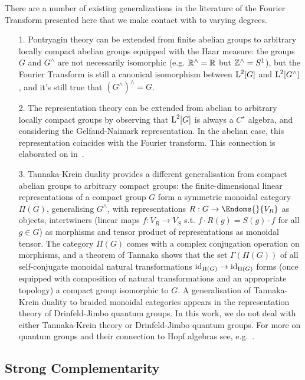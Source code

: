 There are a number of existing generalizations in the literature of the Fourier Transform presented here that we make contact with to varying degrees. 
\begin{enumerate}
\item[1.] Pontryagin theory can be extended from finite abelian groups to arbitrary locally compact abelian groups equipped with the Haar measure: the groups $G$ and $G^\wedge$ are not necessarily isomorphic (e.g. $\mathbb{R}^\wedge = \mathbb{R}$ but $\mathbb{Z}^\wedge = S^1$), but the Fourier Transform is still a canonical isomorphism between $\operatorname{L}^2[G]$ and $\operatorname{L}^2[G^\wedge]$, and it's still true that $(G^\wedge)^\wedge = G$. 

\item[2.] The representation theory can be extended from abelian to arbitrary locally compact groups by observing that $\operatorname{L}^2[G]$ is always a $C^\star$ algebra, and considering the Gelfand-Naimark representation. In the abelian case, this representation coincides with the Fourier transform. This connection is elaborated on in~\cite{gogioso2015fourier}. 

\item[3.] Tannaka-Krein duality provides a different generalisation from compact abelian groups to arbitrary compact groups: the finite-dimensional linear representations of a compact group $G$ form a symmetric monoidal category $\Pi(G)$, generalising $G^\wedge$, with representations $R:G \rightarrow \Endoms{}{V_R}$ as objects, intertwiners (linear maps $f: V_R \rightarrow V_S$ s.t. $f \cdot R(g) = S(g) \cdot f$ for all $g\in G$) as morphisms and tensor product of representations as monoidal tensor. The category $\Pi(G)$ comes with a complex conjugation operation on morphisms, and a theorem of Tannaka shows that the set $\Gamma(\Pi(G))$ of all self-conjugate monoidal natural transformations $\mbox{id}_{\Pi(G)} \rightarrow \mbox{id}_{\Pi(G)}$ forms (once equipped with composition of natural transformations and an appropriate topology) a compact group isomorphic to $G$. A generalisation of Tannaka-Krein duality to braided monoidal categories appears in the representation theory of Drinfeld-Jimbo quantum groups. In this work, we do not deal with either Tannaka-Krein theory or Drinfeld-Jimbo quantum groups.
For more on quantum groups and their connection to Hopf algebras see, 
e.g.~\cite{cartier2007primer,street2007quantum}.
\end{enumerate}

\subsection{Strong Complementarity}
\label{sec:strcompl}

